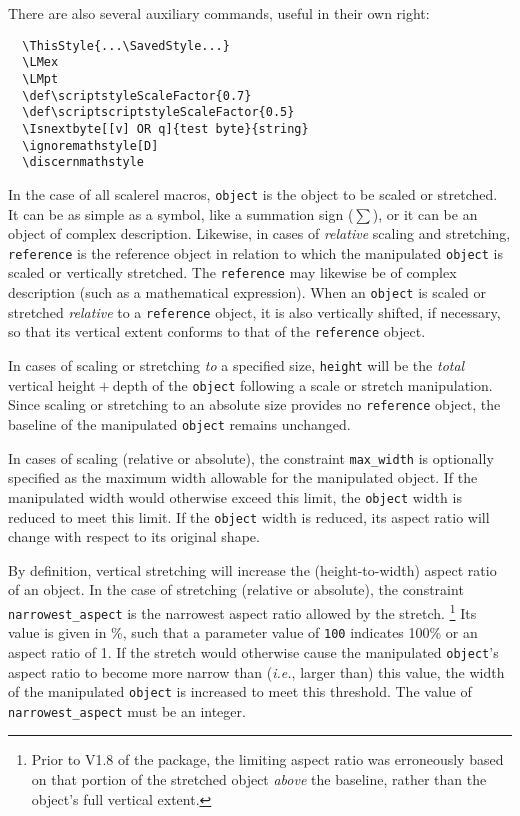 \documentclass{article}
\def\sr{\textsf{scalerel}}
\let\vb\verb
\begin{document}
There are also several auxiliary commands, useful in their own
right:
\begin{verbatim}
  \ThisStyle{...\SavedStyle...}
  \LMex
  \LMpt
  \def\scriptstyleScaleFactor{0.7}
  \def\scriptscriptstyleScaleFactor{0.5}
  \Isnextbyte[[v] OR q]{test byte}{string}
  \ignoremathstyle[D]
  \discernmathstyle
\end{verbatim}

In the case of all \sr{} macros, \vb|object| is the object to be scaled or 
stretched.  It can be as simple as a symbol, like a summation sign
($\sum$), or it can be an object of complex description.  Likewise, in
cases of \textit{relative} scaling and stretching, \vb|reference| is
the reference object in relation to which the manipulated
\vb|object| is scaled or vertically stretched.  The \vb|reference|
may likewise be of complex description (such as a mathematical
expression).  When an \vb|object| is scaled or stretched
\textit{relative} to a \vb|reference| object, it is also vertically
shifted, if necessary, so that its vertical extent conforms to that of
the \vb|reference| object.

In cases of scaling or stretching \textit{to} a specified size,
  \vb|height| will be the \textit{total} vertical height${}+{}$depth of 
  the \vb|object| following a scale or stretch manipulation.  
Since scaling or stretching to an
  absolute size provides no \vb|reference| object, the baseline of
  the manipulated \vb|object| remains unchanged.

In cases of scaling (relative or absolute), the constraint
  \vb|max_width| is optionally specified as the maximum width allowable
  for the manipulated object.  
If the manipulated width would otherwise exceed this limit, the
  \vb|object| width is reduced to meet this limit.  
If the \vb|object| width is reduced, its aspect ratio will change with 
  respect to its original shape.

By definition, vertical stretching will increase the (height-to-width) 
  aspect ratio
  of an object.  
In the case of stretching (relative or absolute), the constraint
  \vb|narrowest_aspect| is the narrowest aspect ratio allowed by the
  stretch.%
\footnote{Prior to V1.8 of the package, the limiting aspect ratio was
  erroneously based on that portion of the stretched object 
  \textit{above} the baseline, rather than the object's full vertical extent.}  
Its value is given in \%, such that a parameter value of \texttt{100}
  indicates 100\% or an aspect ratio of 1.  
If the stretch would otherwise cause the manipulated \vb|object|'s 
  aspect ratio to become more narrow than (\textit{i.e.}, larger 
  than) this value, the width of the manipulated \vb|object| is 
  increased to meet this threshold.  
The value of \vb|narrowest_aspect| must be an integer.
\end{document}
